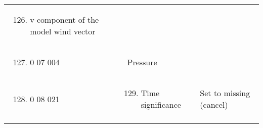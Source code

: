 \begin{longtable}[]{@{}llll@{}}
\begin{minipage}[t]{0.22\columnwidth}
\end{minipage} & \begin{minipage}[t]{0.22\columnwidth}\raggedright
\begin{enumerate}
\setcounter{enumi}{125}
\item
  v-component of the model wind vector
\end{enumerate}\strut
\end{minipage} & \begin{minipage}[t]{0.22\columnwidth}\raggedright
\strut
\end{minipage}\tabularnewline
\begin{minipage}[t]{0.22\columnwidth}\raggedright
\strut
\end{minipage} & \begin{minipage}[t]{0.22\columnwidth}\raggedright
\begin{enumerate}
\setcounter{enumi}{126}
\item
  0 07 004
\end{enumerate}\strut
\end{minipage} & \begin{minipage}[t]{0.22\columnwidth}\raggedright
Pressure\strut
\end{minipage} & \begin{minipage}[t]{0.22\columnwidth}\raggedright
\strut
\end{minipage}\tabularnewline
\begin{minipage}[t]{0.22\columnwidth}\raggedright
\strut
\end{minipage} & \begin{minipage}[t]{0.22\columnwidth}\raggedright
\begin{enumerate}
\setcounter{enumi}{127}
\item
  0 08 021
\end{enumerate}\strut
\end{minipage} & \begin{minipage}[t]{0.22\columnwidth}\raggedright
\begin{enumerate}
\setcounter{enumi}{128}
\item
  Time significance
\end{enumerate}\strut
\end{minipage} & \begin{minipage}[t]{0.22\columnwidth}\raggedright
Set to missing (cancel)\strut
\end{minipage}\tabularnewline
\begin{minipage}[t]{0.22\columnwidth}\raggedright
\strut
\end{minipage} & \begin{minipage}[t]{0.22\columnwidth}\raggedright

\end{minipage}
\end{longtable}
